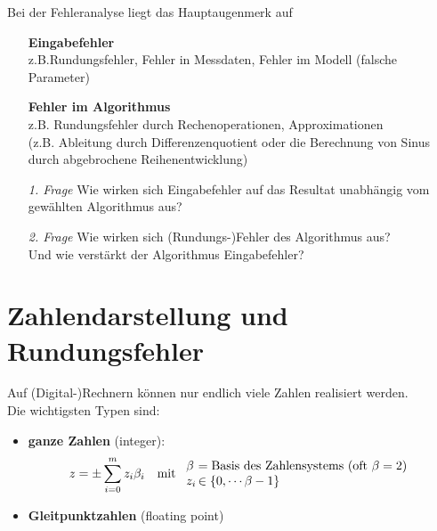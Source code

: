\documentclass[ngerman,fontsize=11pt, paper=a4, parskip=half, titlepage=true, toc=bib]{scrbook}
\theoremstyle{definition}
\theoremstyle{plain}
\newcommand{\sectione}[1]{ \setcounter{equation}{0}\section{#1}}
\begin{document}
Bei der Fehleranalyse liegt das Hauptaugenmerk auf
\begin{itemize}
\item[] \textbf{Eingabefehler}\\ z.B.Rundungsfehler, Fehler in Messdaten, Fehler im Modell (falsche Parameter)
\item[] \textbf{Fehler im Algorithmus} \\ z.B. Rundungsfehler durch Rechenoperationen, Approximationen \\
  (z.B. Ableitung durch Differenzenquotient oder die Berechnung von Sinus durch abgebrochene Reihenentwicklung)
  \\
\item[\textit{1. Frage}] Wie wirken sich Eingabefehler auf das Resultat unabhängig vom gewählten Algorithmus aus?
\item[\textit{2. Frage}]Wie wirken sich (Rundungs-)Fehler des Algorithmus aus?\\
  Und wie verstärkt der Algorithmus Eingabefehler?
\end{itemize}


\sectione{Zahlendarstellung und Rundungsfehler} \label{3.1}  
Auf (Digital-)Rechnern können nur endlich viele Zahlen realisiert werden. \\
Die wichtigsten Typen sind: 
\begin{itemize}
\item \textbf{ganze Zahlen}  (integer):
  \begin{align*}
    z&=\pm \sum_{i=0}^{m}z_i\beta_i & \text{mit }
                                      \begin{array}{l@{\,}l}
                                        \beta &= \text{Basis des Zahlensystems (oft $\beta=2$)} \\
                                        z_i &\in \{0, \cdots \beta-1\}
                                      \end{array}
  \end{align*}
\item \textbf{Gleitpunktzahlen} (floating point) 
\end{itemize}
\end{document}
